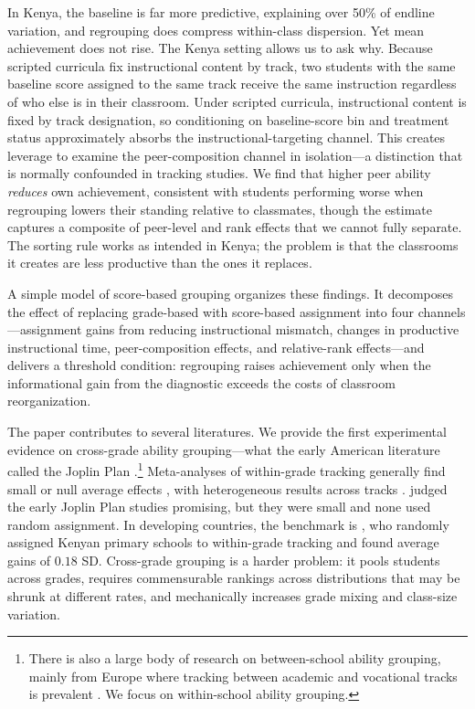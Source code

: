 \documentclass[11pt]{article}
\begin{document}
In Kenya, the baseline is far more predictive, explaining over 50\% of endline variation, and regrouping does compress within-class dispersion. Yet mean achievement does not rise. The Kenya setting allows us to ask why. Because scripted curricula fix instructional content by track, two students with the same baseline score assigned to the same track receive the same instruction regardless of who else is in their classroom. Under scripted curricula, instructional content is fixed by track designation, so conditioning on baseline-score bin and treatment status approximately absorbs the instructional-targeting channel. This creates leverage to examine the peer-composition channel in isolation---a distinction that is normally confounded in tracking studies. We find that higher peer ability \emph{reduces} own achievement, consistent with students performing worse when regrouping lowers their standing relative to classmates, though the estimate captures a composite of peer-level and rank effects that we cannot fully separate. The sorting rule works as intended in Kenya; the problem is that the classrooms it creates are less productive than the ones it replaces.

A simple model of score-based grouping organizes these findings. It decomposes the effect of replacing grade-based with score-based assignment into four channels---assignment gains from reducing instructional mismatch, changes in productive instructional time, peer-composition effects, and relative-rank effects---and delivers a threshold condition: regrouping raises achievement only when the informational gain from the diagnostic exceeds the costs of classroom reorganization.

The paper contributes to several literatures. We provide the first experimental evidence on cross-grade ability grouping---what the early American literature called the Joplin Plan \citep{floyd:1954}.\footnote{There is also a large body of research on between-school ability grouping, mainly from Europe where tracking between academic and vocational tracks is prevalent \citep{fu2018ability,lavrijsen2015new}. We focus on within-school ability grouping.} Meta-analyses of within-grade tracking generally find small or null average effects \citep{slavin:1987,slavin1990achievement,kulik1987effects,terrin2022effect}, with heterogeneous results across tracks \citep{burke2013classroom,hoxby2005taking,antecol2016peer,garlick,de2022college}. \citet{slavin:1987} judged the early Joplin Plan studies promising, but they were small and none used random assignment. In developing countries, the benchmark is \citet{duflo2011peer}, who randomly assigned Kenyan primary schools to within-grade tracking and found average gains of $0.18$ SD. Cross-grade grouping is a harder problem: it pools students across grades, requires commensurable rankings across distributions that may be shrunk at different rates, and mechanically increases grade mixing and class-size variation.
\end{document}
